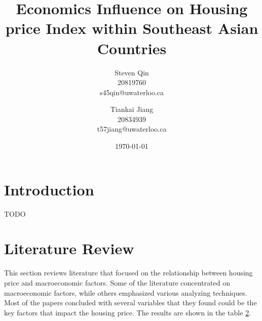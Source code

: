 \documentclass[11pt]{article}
\title{Economics Influence on Housing price Index within Southeast Asian Countries}
\author{Steven Qin\\20819760\\s45qin@uwaterloo.ca \and Tiankai Jiang\\20834939\\t57jiang@uwaterloo.ca}
\date{\today}
\begin{document}
\maketitle

\section{Introduction}\label{introduction}
TODO

\section{Literature Review}\label{literature_review}
This section reviews literature that focused on the relationship between housing price and macroeconomic factors. Some of the literature concentrated on macroeconomic factors, while others emphasized various analyzing techniques. Most of the papers concluded with several variables that they found could be the key factors that impact the housing price. The results are shown in the table \ref{literature_review}.
\end{document}

